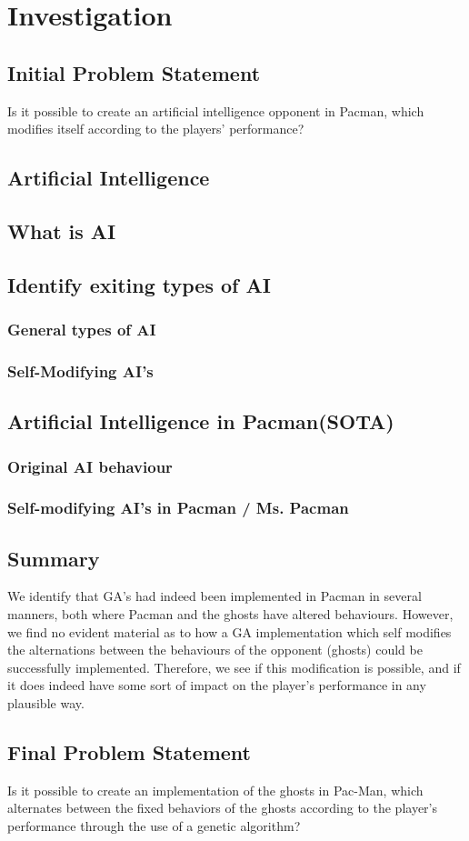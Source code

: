 \section{Investigation} \label{sec:preanalysus}

\subsection{Initial Problem Statement} \label{sec:initialproblemstatement}
Is it possible to create an artificial intelligence opponent in Pacman, which modifies itself according to the players' performance?


\subsection{Artificial Intelligence} \label{sec:ai}
\subsection{What is AI}
\subsection{Identify exiting types of AI}
\subsubsection{General types of AI}
\subsubsection{Self-Modifying AI's}


\subsection{Artificial Intelligence in Pacman(SOTA)}
\subsubsection{Original AI behaviour}
\subsubsection{Self-modifying AI's in Pacman / Ms. Pacman}

\subsection{Summary}
We identify that GA’s had indeed been implemented in Pacman in several manners, both where Pacman and the ghosts have altered behaviours. However, we find no evident material as to how a GA implementation which self modifies the alternations between the behaviours of the opponent (ghosts) could be successfully implemented. Therefore, we see if this modification is possible, and if it does indeed have some sort of impact on the player’s performance in any plausible way.


\subsection{Final Problem Statement} \label{sec:finalproblemstatement}
Is it possible to create an implementation of the ghosts in Pac-Man, which alternates between the fixed behaviors of the ghosts according to the player's performance through the use of a genetic algorithm?